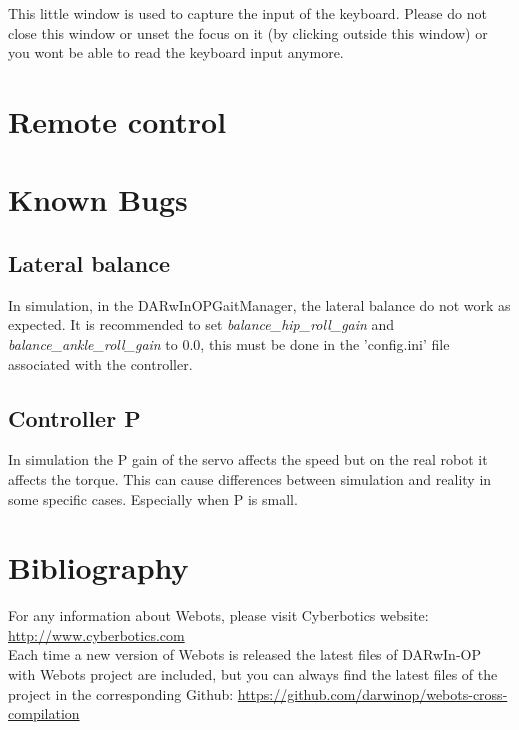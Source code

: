 \documentclass[a4paper, 12pt]{article}  		%
\begin{document}
This little window is used to capture the input of the keyboard. Please do not close this window or unset the focus on it (by clicking outside this window) or you wont be able to read the keyboard input anymore.\\


\newpage
\section{Remote control}


\newpage
\section{Known Bugs}

\subsection{Lateral balance}
In simulation, in the DARwInOPGaitManager, the lateral balance do not work as expected. It is recommended to set \textit{balance\_hip\_roll\_gain} and \textit{balance\_ankle\_roll\_gain} to 0.0, this must be done in the 'config.ini' file associated with the controller.\\

\subsection{Controller P}
In simulation the P gain of the servo affects the speed but on the real robot it affects the torque. This can cause differences between simulation and reality in some specific cases. Especially when P is small.\\


\newpage
\section{Bibliography}

For any information about Webots, please visit Cyberbotics website: \url{http://www.cyberbotics.com}\\

Each time a new version of Webots is released the latest files of DARwIn-OP with Webots project are included, but you can always find the latest files of the project in the corresponding Github: \url{https://github.com/darwinop/webots-cross-compilation}\\
\end{document}
